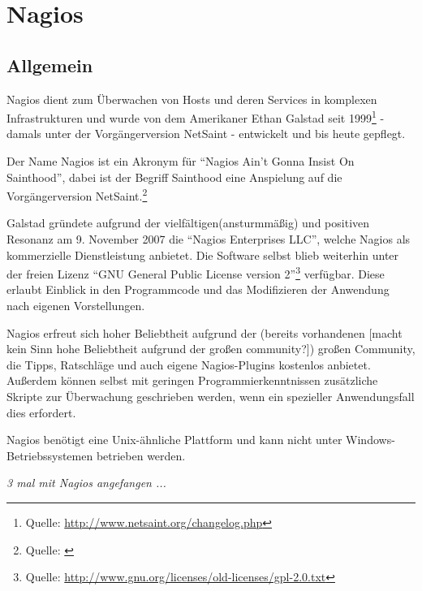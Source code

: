 \section{Nagios}

\subsection{Allgemein}
Nagios dient zum Überwachen von Hosts und deren Services in komplexen Infrastrukturen und wurde von dem Amerikaner Ethan Galstad seit 1999\footnote{Quelle: \url{http://www.netsaint.org/changelog.php}} - damals unter der Vorgängerversion NetSaint - entwickelt und bis heute gepflegt.

Der Name Nagios ist ein Akronym für "`Nagios Ain't Gonna Insist On Sainthood"', dabei ist der Begriff Sainthood eine Anspielung auf die Vorgängerversion NetSaint.\footnote{Quelle: \cite{NagiosFAQ}}

Galstad gründete aufgrund der vielfältigen(ansturmmäßig) und positiven Resonanz am 9. November 2007 die "`Nagios Enterprises LLC"', welche Nagios als kommerzielle Dienstleistung anbietet.
Die Software selbst blieb weiterhin unter der freien Lizenz "`GNU General Public License version 2"'\footnote{Quelle: \url{http://www.gnu.org/licenses/old-licenses/gpl-2.0.txt}} verfügbar.
Diese erlaubt Einblick in den Programmcode und das Modifizieren der Anwendung nach eigenen Vorstellungen.

Nagios erfreut sich hoher Beliebtheit aufgrund der (bereits vorhandenen [macht kein Sinn hohe Beliebtheit aufgrund der großen community?]) großen Community, die Tipps, Ratschläge und auch eigene Nagios-Plugins kostenlos anbietet.
Außerdem können selbst mit geringen Programmierkenntnissen zusätzliche Skripte zur Überwachung geschrieben werden, wenn ein spezieller Anwendungsfall dies erfordert.

Nagios benötigt eine Unix-ähnliche Plattform und kann nicht unter Windows-Betriebssystemen betrieben werden.

\textit{3 mal mit Nagios angefangen ...}







